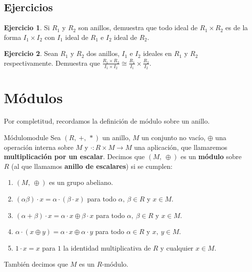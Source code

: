 \documentclass[a4paper]{book}
\theoremstyle{definition}
\theoremstyle{ejemplo}
\newtheorem{exercise}{Ejercicio}[chapter]
\theoremstyle{demostracion}
\begin{document}
\section{Ejercicios}
\begin{exercise}\label{exc:multideals1}
	Si $R_1$ y $R_2$ son anillos, demuestra que todo ideal de $R_1 \times R_2$ es de la forma $I_1 \times I_2$ con $I_1$ ideal de $R_1$ e $I_2$ ideal de $R_2$.
\end{exercise}
\begin{exercise}\label{exc:multideals2}
	Sean $R_1$ y $R_2$ dos anillos, $I_1$ e $I_2$ ideales en $R_1$ y $R_2$ respectivamente. Demuestra que $\frac{R_1 \times R_2}{I_1 \times I_2} \cong \frac{R_1}{I_1} \times \frac{R_2}{I_2}$.
\end{exercise}

\chapter{Módulos}
Por completitud, recordamos la definición de módulo sobre un anillo.

\begin{define}{Módulo}{module}
	Sea $(R,\ +,\ *)$ un anillo, $M$ un conjunto no vacío, $\oplus$ una operación interna sobre $M$ y $\cdot : R \times M \rightarrow M$ una aplicación, que llamaremos \textbf{multiplicación por un escalar}. Decimos que $(M,\ \oplus)$ es un \textbf{módulo} sobre $R$ (al que llamamos \textbf{anillo de escalares}) si se cumplen:
	\begin{enumerate}
		\item
		$(M,\ \oplus)$ es un grupo abeliano.
		
		\item
		$(\alpha \beta)\cdot x = \alpha\cdot ( \beta\cdot  x)$ para todo $\alpha,\ \beta \in R$ y $x \in M$.
		
		\item
		$(\alpha + \beta)\cdot x = \alpha\cdot  x \oplus \beta\cdot  x$ para todo $\alpha,\ \beta \in R$ y $x \in M$.
		
		\item
		$\alpha\cdot  (x \oplus y) = \alpha\cdot  x \oplus \alpha\cdot  y$ para todo $\alpha \in R$ y $x,\ y \in M$.
		
		\item
		$1\cdot x = x$ para $1$ la identidad multiplicativa de $R$ y cualquier $x \in M$.
	\end{enumerate}
	También decimos que $M$ es un $R$-módulo.
\end{define}
\end{document}
